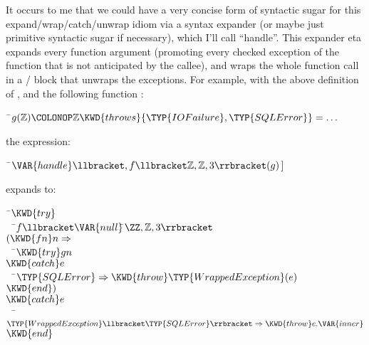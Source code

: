 \begin{itemize}
It occurs to me that we could have a very concise form of syntactic  sugar
for this expand/wrap/catch/unwrap idiom via a syntax expander  (or maybe
just primitive syntactic sugar if necessary), which I'll  call ``handle''.
This expander eta expands every function argument  (promoting every checked
exception of the function that is not  anticipated by the callee), and
wraps the whole function call in a  / block that
unwraps the exceptions. For example, with the  above definition of ,
and the following function :

\begin{Fortress}
{\tt~}\pushtabs\=\+\( g(\mathbb{Z})\COLONOP\mathbb{Z} \KWD{throws} \{\TYP{IOFailure}, \TYP{SQLError}\} = \ldots\)\-\\\poptabs
\end{Fortress}

the expression:

\begin{Fortress}
{\tt~}\pushtabs\=\+\( \VAR{handle}\llbracket,f\llbracket\mathbb{Z},\mathbb{Z},3\rrbracket(g)\,]\)\-\\\poptabs
\end{Fortress}

expands to:

\begin{Fortress}
{\tt~}\pushtabs\=\+\( \KWD{try}\)\\
{\tt~~}\pushtabs\=\+\(   f\llbracket\VAR{null}\)\pushtabs\=\+\(\ZZ,\mathbb{Z},3\rrbracket\)\\
\(     (\KWD{fn} n \Rightarrow\)\\
{\tt~~}\pushtabs\=\+\(       \KWD{try} g n\)\\
\(       \KWD{catch} e\)\\
{\tt~~}\pushtabs\=\+\(         \TYP{SQLError} \Rightarrow \KWD{throw} \TYP{WrappedException}(e)\)\-\\\poptabs
\(       \KWD{end})\)\-\-\-\\\poptabs\poptabs\poptabs
\( \KWD{catch} e\)\\
{\tt~~}\pushtabs\=\+\(   \TYP{WrappedException}\llbracket\TYP{SQLError}\rrbracket \Rightarrow \KWD{throw} e.\VAR{inner}\)\-\\\poptabs
\( \KWD{end}\)\-\\\poptabs
\end{Fortress}


\end{itemize}
